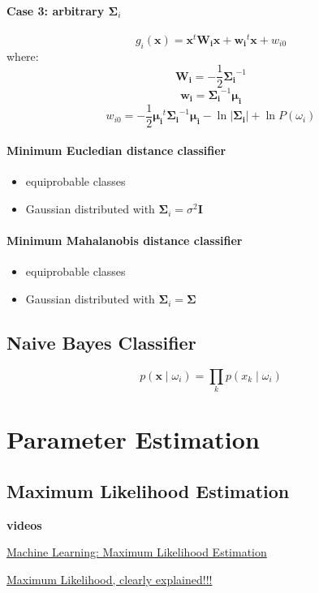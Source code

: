 \documentclass{report}
\begin{document}
\subsubsection*{Case 3: arbitrary $\symbf{\Sigma}_i$}
\[g_i(\symbf{x}) = \symbf{x}^t \symbf{W_i} \symbf{x} + \symbf{w_i}^t \symbf{x} + w_{i0}\]
where:
\[\symbf{W_i} = -\frac{1}{2}\symbf{\Sigma_i}^{-1}\]
\[\symbf{w_i} = \symbf{\Sigma_i}^{-1} \symbf{\mu_i}\]
\[w_{i0} = -\frac{1}{2}\symbf{\mu_i}^t \symbf{\Sigma_i}^{-1} \symbf{\mu_i} - \ln |\symbf{\Sigma_i}| + \ln P(\omega_i) \]

\subsubsection*{Minimum Eucledian distance classifier}
\begin{itemize}
	\item equiprobable classes
	\item Gaussian distributed with $\symbf{\Sigma}_i = \sigma^2 \symbf{I}$
\end{itemize}

\subsubsection*{Minimum Mahalanobis distance classifier}
\begin{itemize}
	\item equiprobable classes
	\item Gaussian distributed with $\symbf{\Sigma}_i = \symbf{\Sigma}$
\end{itemize}

\section{Naive Bayes Classifier}
\[p(\symbf{x} \mid \omega_i) = \prod_{k} p(x_k \mid \omega_i)\]


\chapter{Parameter Estimation}

\section{Maximum Likelihood Estimation}
\begin{mdframed}
	\textbf{videos}

	\href{https://www.youtube.com/watch?v=sguol03tfWo&list=PL5yR0euE9N2kGEf7gqysMFq0Spoq0evNf&index=2}{Machine Learning: Maximum Likelihood Estimation}

	\href{https://www.youtube.com/watch?v=XepXtl9YKwc}{Maximum Likelihood, clearly explained!!!}
\end{mdframed}
\end{document}
